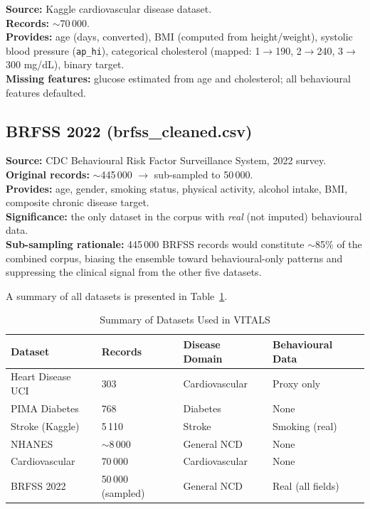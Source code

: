 \documentclass[12pt,a4paper]{report}
\begin{document}
\textbf{Source:} Kaggle cardiovascular disease dataset.\\
\textbf{Records:} $\sim$70\,000.\\
\textbf{Provides:} age (days, converted), BMI (computed from height/weight), systolic blood pressure (\texttt{ap\_hi}), categorical cholesterol (mapped: 1$\to$190, 2$\to$240, 3$\to$300 mg/dL), binary target.\\
\textbf{Missing features:} glucose estimated from age and cholesterol; all behavioural features defaulted.

\subsection{BRFSS 2022 (brfss\_cleaned.csv)}

\textbf{Source:} CDC Behavioural Risk Factor Surveillance System, 2022 survey.\\
\textbf{Original records:} $\sim$445\,000 $\to$ sub-sampled to 50\,000.\\
\textbf{Provides:} age, gender, smoking status, physical activity, alcohol intake, BMI, composite chronic disease target.\\
\textbf{Significance:} the only dataset in the corpus with \textit{real} (not imputed) behavioural data.\\
\textbf{Sub-sampling rationale:} 445\,000 BRFSS records would constitute $\sim$85\% of the combined corpus, biasing the ensemble toward behavioural-only patterns and suppressing the clinical signal from the other five datasets.

\vspace{0.5em}

A summary of all datasets is presented in Table~\ref{tab:datasets}.

\begin{table}[H]
\centering
\caption{Summary of Datasets Used in VITALS}
\label{tab:datasets}
\begin{tabularx}{\textwidth}{lXXX}
\toprule
\textbf{Dataset} & \textbf{Records} & \textbf{Disease Domain} & \textbf{Behavioural Data} \\
\midrule
Heart Disease UCI & 303 & Cardiovascular & Proxy only \\
PIMA Diabetes & 768 & Diabetes & None \\
Stroke (Kaggle) & 5\,110 & Stroke & Smoking (real) \\
NHANES & $\sim$8\,000 & General NCD & None \\
Cardiovascular & 70\,000 & Cardiovascular & None \\
BRFSS 2022 & 50\,000 (sampled) & General NCD & Real (all fields) \\
\bottomrule
\end{tabularx}
\end{table}
\end{document}
